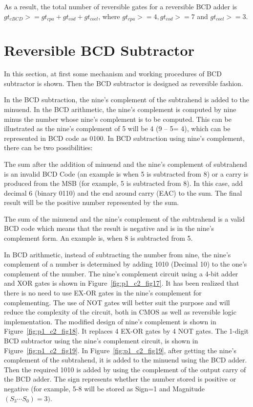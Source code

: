 As a result, the total number of reversible gates for a reversible BCD adder is $gt{}_{cBCD}{>} = gt{}_{cpa} + gt{}_{cod} + gt{}_{cocl}$, where $gt{}_{cpa}{>} = 4, gt{}_{cod}{>}= 7$ and $gt{}_{cocl}{>} = 3$.

\section{Reversible BCD Subtractor}
In this section, at first some mechanism and working procedures of BCD subtractor is shown. Then the BCD subtractor is designed as reversible fashion. %

In the BCD subtraction, the nine's complement of the subtrahend is added to the minuend. In the BCD arithmetic, the nine's complement is computed by nine minus the number whose nine's complement is to be computed. This can be illustrated as the nine's complement of 5 will be 4 (9 -- 5= 4), which can be represented in BCD code as 0100. In BCD subtraction using nine's complement, there can be two possibilities:

The sum after the addition of minuend and the nine's complement of subtrahend is an invalid BCD Code (an example is when 5 is subtracted from 8) or a carry is produced from the MSB (for example, 5 is subtracted from 8). In this case, add decimal 6 (binary 0110) and the end around carry (EAC) to the sum. The final result will be the positive number represented by the sum.

The sum of the minuend and the nine's complement of the subtrahend is a valid BCD code which means that the result is negative and is in the nine's complement form. An example is, when 8 is subtracted from 5.

In BCD arithmetic, instead of subtracting the number from nine, the nine's complement of a number is determined by adding 1010 (Decimal 10) to the one's complement of the number. The nine's complement circuit using a 4-bit adder and XOR gates is shown in Figure~\ref{fig:p1_c2_fig17}. It has been realized that there is no need to use EX-OR gates in the nine's complement for complementing. The use of NOT gates will better suit the purpose and will reduce the complexity of the circuit, both in CMOS as well as reversible logic implementation. The modified design of nine's complement is shown in Figure~\ref{fig:p1_c2_fig18}. It replaces 4 EX-OR gates by 4 NOT gates. The 1-digit BCD subtractor using the nine's complement circuit, is shown in Figure~\ref{fig:p1_c2_fig19}. In Figure~\ref{fig:p1_c2_fig19}, after getting the nine's complement of the subtrahend, it is added to the minuend using the BCD adder. Then the required 1010 is added by using the complement of the output carry of the BCD adder. The sign represents whether the number stored is positive or negative (for example, 5-8 will be stored as Sign=1 and Magnitude $(S_3 \cdots S_0) = 3)$.

